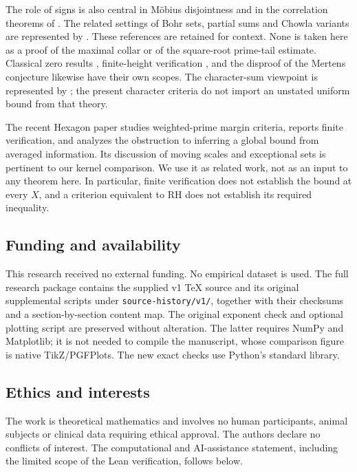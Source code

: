 The role of signs is also central in M\"obius disjointness
\cite{sarnak-letter,bourgain-sarnak-ziegler} and in the correlation
theorems of \cite{mr-short,mrt,matomaki-radziwill-tao-signs,tao,
tao-teravainen,klurman,teravainen-binary}. The related settings
of Bohr sets, partial sums and Chowla variants are represented
by \cite{teravainen-walker,chavez,krishnamoorthy-chowla}.
These references are retained for context. None is taken here
as a proof of the maximal collar or of the square-root
prime-tail estimate. Classical zero results \cite{selberg},
finite-height verification \cite{pt}, and the disproof of the
Mertens conjecture \cite{odlyzko-teriele} likewise have their
own scopes. The character-sum viewpoint is represented by
\cite{granville-soundararajan}; the present character criteria
do not import an unstated uniform bound from that theory.

The recent Hexagon paper \cite{caceres} studies weighted-prime
margin criteria, reports finite verification, and analyzes
the obstruction to inferring a global bound from averaged
information. Its discussion of moving scales and exceptional
sets is pertinent to our kernel comparison. We use it as
related work, not as an input to any theorem here. In
particular, finite verification does not establish the bound
at every \(X\), and a criterion equivalent to RH does not
establish its required inequality.

\subsection{Funding and availability}
This research received no external funding. No empirical dataset
is used. The full research package contains the supplied v1 TeX
source and its original supplemental scripts under
\texttt{source-history/v1/}, together with their checksums and
a section-by-section content map. The original exponent check
and optional plotting script are preserved without alteration.
The latter requires NumPy and Matplotlib; it is not needed to
compile the manuscript, whose comparison figure is native
TikZ/PGFPlots. The new exact checks use Python's standard library.

\subsection{Ethics and interests}
The work is theoretical mathematics and involves no human
participants, animal subjects or clinical data requiring ethical
approval. The authors declare no conflicts of interest. The
computational and AI-assistance statement, including the
limited scope of the Lean verification, follows below.
